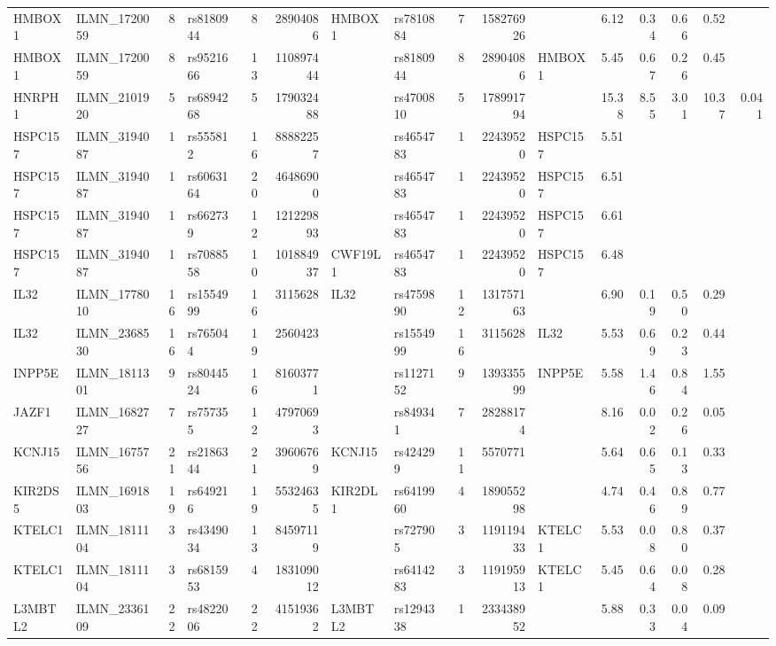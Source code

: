 \documentclass{article}
\begin{document}
\begin{landscape}
{\begin{ThreePartTable}
\begin{longtable}{|llr|lrrl|lrrl|rrrr|r|}
  HMBOX1 & ILMN\_1720059 & 8 & rs8180944 & 8 & 28904086 & HMBOX1 & rs7810884 & 7 & 158276926 &  & 6.12 & 0.34 & 0.66 & 0.52 &  \\
  HMBOX1 & ILMN\_1720059 & 8 & rs9521666 & 13 & 110897444 &  & rs8180944 & 8 & 28904086 & HMBOX1 & 5.45 & 0.67 & 0.26 & 0.45 &  \\
  HNRPH1 & ILMN\_2101920 & 5 & rs6894268 & 5 & 179032488 &  & rs4700810 & 5 & 178991794 &  & 15.38 & 8.55 & 3.01 & 10.37 & 0.041 \\
  HSPC157 & ILMN\_3194087 & 1 & rs555812 & 16 & 88882257 &  & rs4654783 & 1 & 22439520 & HSPC157 & 5.51 &  &  &  &  \\
  HSPC157 & ILMN\_3194087 & 1 & rs6063164 & 20 & 46486900 &  & rs4654783 & 1 & 22439520 & HSPC157 & 6.51 &  &  &  &  \\
  HSPC157 & ILMN\_3194087 & 1 & rs662739 & 12 & 121229893 &  & rs4654783 & 1 & 22439520 & HSPC157 & 6.61 &  &  &  &  \\
  HSPC157 & ILMN\_3194087 & 1 & rs7088558 & 10 & 101884937 & CWF19L1 & rs4654783 & 1 & 22439520 & HSPC157 & 6.48 &  &  &  &  \\
  IL32 & ILMN\_1778010 & 16 & rs1554999 & 16 & 3115628 & IL32 & rs4759890 & 12 & 131757163 &  & 6.90 & 0.19 & 0.50 & 0.29 &  \\
  IL32 & ILMN\_2368530 & 16 & rs765044 & 19 & 2560423 &  & rs1554999 & 16 & 3115628 & IL32 & 5.53 & 0.69 & 0.23 & 0.44 &  \\
  INPP5E & ILMN\_1811301 & 9 & rs8044524 & 16 & 81603771 &  & rs1127152 & 9 & 139335599 & INPP5E & 5.58 & 1.46 & 0.84 & 1.55 &  \\
  JAZF1 & ILMN\_1682727 & 7 & rs757355 & 12 & 47970693 &  & rs849341 & 7 & 28288174 &  & 8.16 & 0.02 & 0.26 & 0.05 &  \\
  KCNJ15 & ILMN\_1675756 & 21 & rs2186344 & 21 & 39606769 & KCNJ15 & rs424299 & 11 & 5570771 &  & 5.64 & 0.65 & 0.13 & 0.33 &  \\
  KIR2DS5 & ILMN\_1691803 & 19 & rs649216 & 19 & 55324635 & KIR2DL1 & rs6419960 & 4 & 189055298 &  & 4.74 & 0.46 & 0.89 & 0.77 &  \\
  KTELC1 & ILMN\_1811104 & 3 & rs4349034 & 13 & 84597119 &  & rs727905 & 3 & 119119433 & KTELC1 & 5.53 & 0.08 & 0.80 & 0.37 &  \\
  KTELC1 & ILMN\_1811104 & 3 & rs6815953 & 4 & 183109012 &  & rs6414283 & 3 & 119195913 & KTELC1 & 5.45 & 0.64 & 0.08 & 0.28 &  \\
  L3MBTL2 & ILMN\_2336109 & 22 & rs4822006 & 22 & 41519362 & L3MBTL2 & rs1294338 & 1 & 233438952 &  & 5.88 & 0.33 & 0.04 & 0.09 &  \\

\end{longtable}
\end{ThreePartTable}}
\end{landscape}
\end{document}
